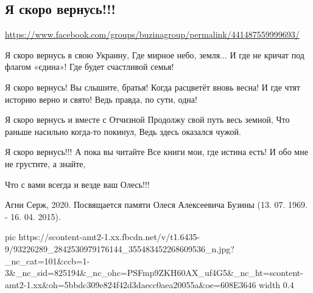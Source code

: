  
 
 
 
 

\subsection{Я скоро вернусь!!!}
\label{sec:apr_2020.fb.buzinagroup.2.oles}
\url{https://www.facebook.com/groups/buzinagroup/permalink/441487559999693/}

Я скоро вернусь в свою Украину, 
Где мирное небо, земля...
И где не кричат под флагом «єдина»! 
Где будет счастливой семья!

Я скоро вернусь! Вы слышите, братья! 
Когда расцветёт вновь весна!
И где чтят историю верно и свято! 
Ведь правда, по сути, одна! 

Я скоро вернусь и вместе с Отчизной
Продолжу свой путь весь земной,
Что раньше насильно когда-то покинул, 
Ведь здесь оказался чужой.

Я скоро вернусь!!! А пока вы читайте
Все книги мои, где истина есть!
И обо мне не грустите, а знайте, 

Что с вами всегда и везде ваш Олесь!!!

Агни Серж, 2020. 
Посвящается памяти Олеся Алексеевича Бузины (13. 07. 1969. - 16. 04. 2015).


\ifcmt
  pic https://scontent-amt2-1.xx.fbcdn.net/v/t1.6435-9/93226289_2842530979176144_355483452268609536_n.jpg?_nc_cat=101&ccb=1-3&_nc_sid=825194&_nc_ohc=PSFmp9ZKH60AX_uf4G5&_nc_ht=scontent-amt2-1.xx&oh=5bbdc309e824f42d3daecc0aea20055a&oe=608E3646
  width 0.4
\fi

